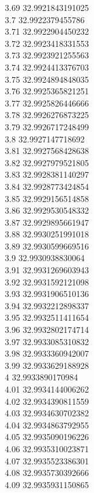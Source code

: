 {3.69	32.9921843191025\\
3.7	32.9922379455786\\
3.71	32.9922904450232\\
3.72	32.9923418331553\\
3.73	32.9923921255563\\
3.74	32.9924413376703\\
3.75	32.9924894848035\\
3.76	32.9925365821251\\
3.77	32.9925826446666\\
3.78	32.9926276873225\\
3.79	32.9926717248499\\
3.8	32.9927147718692\\
3.81	32.9927568428638\\
3.82	32.9927979521805\\
3.83	32.9928381140297\\
3.84	32.9928773424854\\
3.85	32.9929156514858\\
3.86	32.9929530548332\\
3.87	32.9929895661947\\
3.88	32.9930251991018\\
3.89	32.9930599669516\\
3.9	32.9930938830064\\
3.91	32.9931269603943\\
3.92	32.9931592121098\\
3.93	32.9931906510136\\
3.94	32.9932212898337\\
3.95	32.9932511411654\\
3.96	32.9932802174714\\
3.97	32.9933085310832\\
3.98	32.9933360942007\\
3.99	32.9933629188928\\
4	32.9933890170984\\
4.01	32.9934144006262\\
4.02	32.9934390811559\\
4.03	32.9934630702382\\
4.04	32.9934863792955\\
4.05	32.9935090196226\\
4.06	32.9935310023871\\
4.07	32.9935523386301\\
4.08	32.9935730392666\\
4.09	32.9935931150865\\
}
